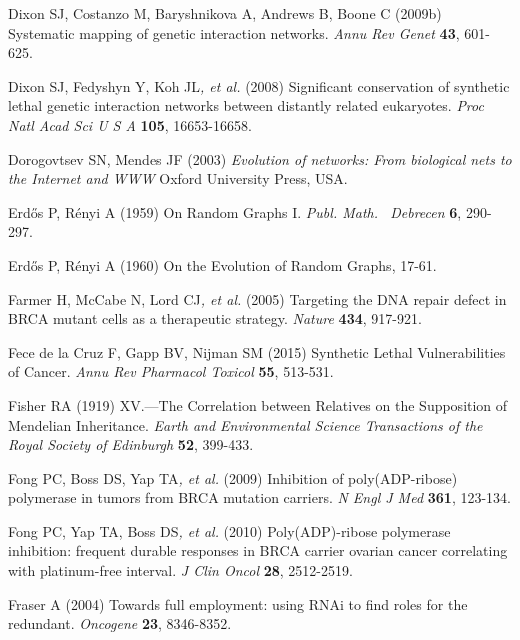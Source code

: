 Dixon SJ, Costanzo M, Baryshnikova A, Andrews B, Boone C (2009b)
Systematic mapping of genetic interaction networks. \textit{Annu Rev
Genet} \textbf{43}, 601-625.



Dixon SJ, Fedyshyn Y, Koh JL\textit{, et al.} (2008) Significant
conservation of synthetic lethal genetic interaction networks between
distantly related eukaryotes. \textit{Proc Natl Acad Sci U S A}
\textbf{105}, 16653-16658.



Dorogovtsev SN, Mendes JF (2003) \textit{Evolution of networks: From
biological nets to the Internet and WWW} Oxford University Press, USA.



Erd\H{o}s P, R\'enyi A (1959) On Random Graphs I. \textit{Publ. Math.
\ Debrecen} \textbf{6}, 290-297.



Erd\H{o}s P, R\'enyi A (1960) On the Evolution of Random Graphs, 17-61.



\hypertarget{ENREF39}{}Farmer H, McCabe N, Lord CJ\textit{, et al.}
(2005) Targeting the DNA repair defect in BRCA mutant cells as a
therapeutic strategy. \textit{Nature} \textbf{434}, 917-921.



Fece de la Cruz F, Gapp BV, Nijman SM (2015) Synthetic Lethal
Vulnerabilities of Cancer. \textit{Annu Rev Pharmacol Toxicol}
\textbf{55}, 513-531.



Fisher RA (1919) XV.---The Correlation between Relatives on the
Supposition of Mendelian Inheritance. \textit{Earth and Environmental
Science Transactions of the Royal Society of Edinburgh} \textbf{52},
399-433.



Fong PC, Boss DS, Yap TA\textit{, et al.} (2009) Inhibition of
poly(ADP-ribose) polymerase in tumors from BRCA mutation carriers.
\textit{N Engl J Med} \textbf{361}, 123-134.



Fong PC, Yap TA, Boss DS\textit{, et al.} (2010) Poly(ADP)-ribose
polymerase inhibition: frequent durable responses in BRCA carrier
ovarian cancer correlating with platinum-free interval. \textit{J Clin
Oncol} \textbf{28}, 2512-2519.



Fraser A (2004) Towards full employment: using RNAi to find roles for
the redundant. \textit{Oncogene} \textbf{23}, 8346-8352.



